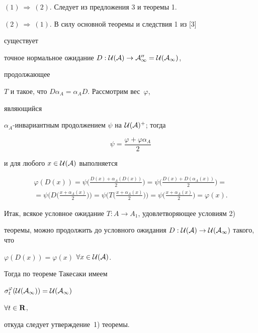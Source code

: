 \begin{pf} 


$(1)\ \Rightarrow\ (2)$. Следует из предложения 3 и теоремы 1. 


\smallskip 


 


$(2)\ \Rightarrow\ (1)$. В силу основной теоремы и следствия 1 из [3] 


существует 


точное нормальное ожидание $D:\cal U(A)\to A''_1=\cal U(A_1)$, 


продолжающее 


$T$ и такое, что $D\alpha_A=\alpha_A{}D$. Рассмотрим вес~$\varphi$, 


являющийся 


$\alpha_A$-инвариантным продолжением $\psi$ на $\cal U(A)^+$; тогда 


$$ 


\psi=\frac{\varphi+\varphi\alpha_A}{2}


$$ 


и для любого $x\in\cal U(A)$ выполняется 


\begin{multline*} 


\varphi(D(x))=\psi\bigg( 


\frac{D(x)+\alpha_A(D(x))}{2}\bigg)=\psi\bigg( 


\frac{D(x)+D(\alpha_A(x))}{2}\bigg)= \\ 


% 


=\psi\bigg(D\bigg(\frac{x+\alpha_A(x)}2{} \bigg) \bigg)= 


\psi\bigg(T\bigg(\frac{x+\alpha_A(x)}{2} \bigg) \bigg)= 


\psi\bigg(\frac{x+\alpha_A(x)}{2} \bigg)=\varphi(x). 


\end{multline*} 


Итак, всякое условное ожидание $T:A\to A_1$, удовлетворяющее условиям 2) 


теоремы, можно продолжить до условного ожидания $D:\cal U(A)\to\cal 


U(A_1)$ такого, что 


$\varphi(D(x))=\varphi(x)$ $\forall x\in\cal U(A)$. 


Тогда по теореме Такесаки имеем 


$\sigma^\varphi_t(\cal U(A_1))=\cal U(A_1)$ 


$\forall t\in\bold R$, 


откуда следует утверждение~1) теоремы. 


\end{pf} 


